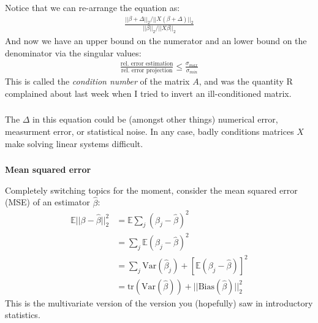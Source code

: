 \begin{frame}[fragile] \frametitle{}

Notice that we can re-arrange the equation as:
\begin{align*}
\frac{|| \beta + \Delta ||_2 / || X(\beta + \Delta) ||_2}{|| \beta ||_2 / || X\beta ||_2}
\end{align*}
And now we have an upper bound on the numerator and an lower bound on the
denominator via the singular values:
\begin{align*}
\frac{\text{rel. error estimation}}{\text{rel. error projection}} \leq \frac{\sigma_{max}}{\sigma_{min}}
\end{align*}
\pause This is called the \textit{condition number} of the matrix $A$, and was the
quantity R complained about last week when I tried to invert an ill-conditioned
matrix.

\end{frame}

\begin{frame}[fragile] \frametitle{}

The $\Delta$ in this equation could be (amongst other things)
numerical error, measurment error, or statistical noise. In any
case, badly conditions matrices $X$ make solving linear systems
difficult.

\end{frame}

\begin{frame}[fragile] \frametitle{}

\textbf{Mean squared error}

Completely switching topics for the moment, consider the mean
squared error (MSE) of an estimator $\widehat{\beta}$:\pause
\begin{align*}
\mathbb{E} || \beta - \widehat{\beta} ||_2^2
&= \mathbb{E} \sum_j (\beta_j - \widehat{\beta})^2\\
&= \sum_j \mathbb{E} (\beta_j - \widehat{\beta})^2\\
&= \sum_j \text{Var} (\widehat{\beta}_j) + \left[\mathbb{E} (\beta_j - \widehat{\beta}) \right]^2\\
&= \text{tr} (\text{Var}(\widehat{\beta})) + ||\text{Bias}(\widehat{\beta}) ||_2^2
\end{align*}
\pause This is the multivariate version of the version you (hopefully) saw in
introductory statistics.

\end{frame}

